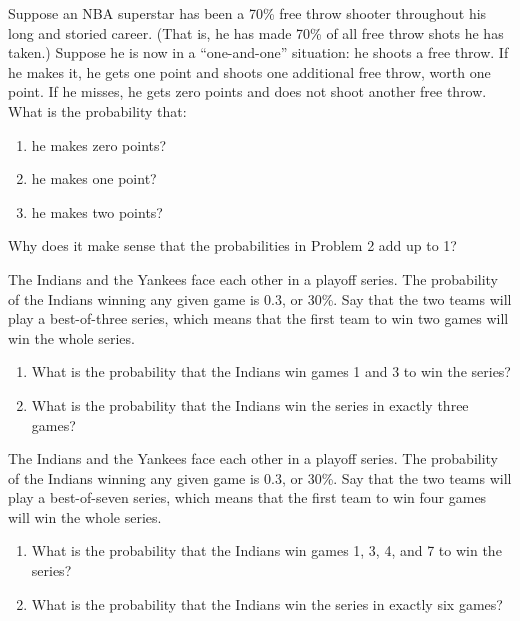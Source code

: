 \documentclass{ximera}
\begin{document}
\begin{problem}\label{NBAStar}
Suppose an NBA superstar has been a 70\% free throw shooter throughout his long and storied career.  (That is, he has made 70\% of all free throw shots he has taken.)  Suppose he is now in a ``one-and-one'' situation: he shoots a free throw.  If he makes it, he gets one point and shoots one additional free throw, worth one point.  If he misses, he gets zero points and does not shoot another free throw.  What is the probability that:
\begin{enumerate}
\item he makes zero points?
\item he makes one point?
\item he makes two points?
\end{enumerate}
\end{problem}

\begin{problem}
Why does it make sense that the probabilities in Problem 2 add up to 1?
\end{problem}

\begin{problem}
The Indians and the Yankees face each other in a playoff series.  The probability of the Indians winning any given game is 0.3, or 30\%.  Say that the two teams will play a best-of-three series, which means that the first team to win two games will win the whole series.

\begin{enumerate}
\item What is the probability that the Indians win games 1 and 3 to win the series?
\item What is the probability that the Indians win the series in exactly three games?
\end{enumerate}
\end{problem}

\begin{problem}
The Indians and the Yankees face each other in a playoff series.  The probability of the Indians winning any given game is 0.3, or 30\%.  Say that the two teams will play a best-of-seven series, which means that the first team to win four games will win the whole series.

\begin{enumerate}
\item What is the probability that the Indians win games 1, 3, 4, and 7 to win the series?
\item What is the probability that the Indians win the series in exactly six games?
\end{enumerate}
\end{problem}
\end{document}
